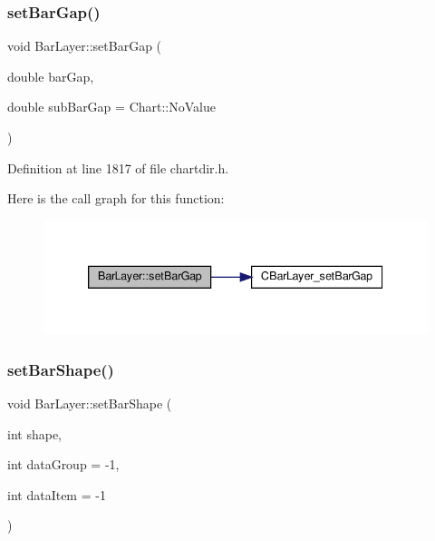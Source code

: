\subsubsection{\texorpdfstring{set\+Bar\+Gap()}{setBarGap()}}
{\footnotesize\ttfamily void Bar\+Layer\+::set\+Bar\+Gap (\begin{DoxyParamCaption}\item[{double}]{bar\+Gap,  }\item[{double}]{sub\+Bar\+Gap = {\ttfamily Chart\+:\+:NoValue} }\end{DoxyParamCaption})\hspace{0.3cm}{\ttfamily [inline]}}



Definition at line 1817 of file chartdir.\+h.

Here is the call graph for this function\+:
\nopagebreak
\begin{figure}[H]
\begin{center}
\leavevmode
\includegraphics[width=339pt]{class_bar_layer_a2452f8f6856168aa6e9997a56fff1a05_cgraph}
\end{center}
\end{figure}
\mbox{\label{class_bar_layer_a95b024aa48934d0917b0342d16d4fca5}} 
\subsubsection{\texorpdfstring{set\+Bar\+Shape()}{setBarShape()}\hspace{0.1cm}{\footnotesize\ttfamily [1/2]}}
{\footnotesize\ttfamily void Bar\+Layer\+::set\+Bar\+Shape (\begin{DoxyParamCaption}\item[{int}]{shape,  }\item[{int}]{data\+Group = {\ttfamily -\/1},  }\item[{int}]{data\+Item = {\ttfamily -\/1} }\end{DoxyParamCaption})\hspace{0.3cm}{\ttfamily [inline]}}



